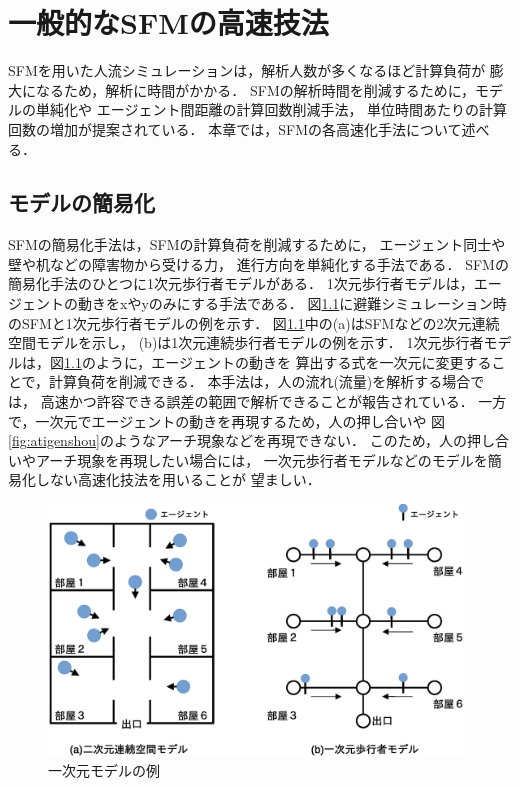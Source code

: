 \chapter{一般的なSFMの高速技法}
\label{sec:survey}
SFMを用いた人流シミュレーションは，解析人数が多くなるほど計算負荷が
膨大になるため，解析に時間がかかる．
SFMの解析時間を削減するために，モデルの単純化や
エージェント間距離の計算回数削減手法，
単位時間あたりの計算回数の増加が提案されている．
本章では，SFMの各高速化手法について述べる．

\section{モデルの簡易化}
SFMの簡易化手法は，SFMの計算負荷を削減するために，
エージェント同士や壁や机などの障害物から受ける力，
進行方向を単純化する手法である．
SFMの簡易化手法のひとつに1次元歩行者モデルがある\cite{1jigen_model}．
1次元歩行者モデルは，エージェントの動きをxやyのみにする手法である．
図\ref{fig:ichijigen_ex}に避難シミュレーション時のSFMと1次元歩行者モデルの例を示す．
図\ref{fig:ichijigen_ex}中の(a)はSFMなどの2次元連続空間モデルを示し，
(b)は1次元連続歩行者モデルの例を示す．
1次元歩行者モデルは，図\ref{fig:ichijigen_ex}のように，エージェントの動きを
算出する式を一次元に変更することで，計算負荷を削減できる．
本手法は，人の流れ(流量)を解析する場合では，
高速かつ許容できる誤差の範囲で解析できることが報告されている\cite{1jigen_model}．
一方で，一次元でエージェントの動きを再現するため，人の押し合いや
図\ref{fig:atigenshou}のようなアーチ現象などを再現できない．
このため，人の押し合いやアーチ現象を再現したい場合には，
一次元歩行者モデルなどのモデルを簡易化しない高速化技法を用いることが
望ましい．

\begin{figure}[hbtp]
 \begin{center}
  \includegraphics[width=11cm,clip]{figure/ichijigen_ex.eps}
  \caption{一次元モデルの例}
  \label{fig:ichijigen_ex}
 \end{center}
\end{figure}

